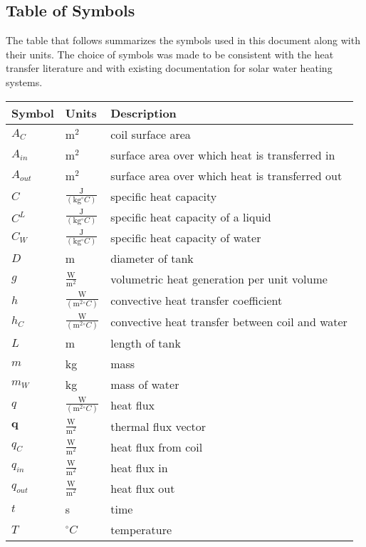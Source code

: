\documentclass[12pt]{article}
\begin{document}
\subsection{Table of Symbols}
\label{Sec:ToS}
The table that follows summarizes the symbols used in this document along with their units.  The choice of symbols was made to be consistent with the heat transfer literature and with existing documentation for solar water heating systems.
\begin{longtable*}{l l l}
\toprule
Symbol & Units & Description
\\
\midrule
$A_{C}$ & $\text{m}^{2}$ & coil surface area
\\
$A_{in}$ & $\text{m}^{2}$ & surface area over which heat is transferred in
\\
$A_{out}$ & $\text{m}^{2}$ & surface area over which heat is transferred out
\\
$C$ & $\frac{\text{J}}{(\text{kg}{}^{\circ}C)}$ & specific heat capacity
\\
$C^{L}$ & $\frac{\text{J}}{(\text{kg}{}^{\circ}C)}$ & specific heat capacity of a liquid
\\
$C_{W}$ & $\frac{\text{J}}{(\text{kg}{}^{\circ}C)}$ & specific heat capacity of water
\\
$D$ & m & diameter of tank
\\
$g$ & $\frac{\text{W}}{\text{m}^{2}}$ & volumetric heat generation per unit volume
\\
$h$ & $\frac{\text{W}}{(\text{m}^{2}{}^{\circ}C)}$ & convective heat transfer coefficient
\\
$h_{C}$ & $\frac{\text{W}}{(\text{m}^{2}{}^{\circ}C)}$ & convective heat transfer between coil and water
\\
$L$ & m & length of tank
\\
$m$ & kg & mass
\\
$m_{W}$ & kg & mass of water
\\
$q$ & $\frac{\text{W}}{(\text{m}^{2}{}^{\circ}C)}$ & heat flux
\\
$\mathbf{q}$ & $\frac{\text{W}}{\text{m}^{2}}$ & thermal flux vector
\\
$q_{C}$ & $\frac{\text{W}}{\text{m}^{2}}$ & heat flux from coil
\\
$q_{in}$ & $\frac{\text{W}}{\text{m}^{2}}$ & heat flux in
\\
$q_{out}$ & $\frac{\text{W}}{\text{m}^{2}}$ & heat flux out
\\
$t$ & s & time
\\
$T$ & ${}^{\circ}C$ & temperature

\end{longtable*}
\end{document}
